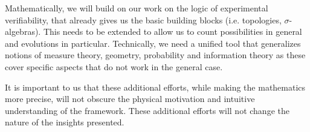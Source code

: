 \documentclass[letterpaper,twocolumn]{article}
\begin{document}
Mathematically, we will build on our work on the logic of experimental verifiability, that already gives us the basic building blocks (i.e. topologies, $\sigma$-algebras). This needs to be extended to allow us to count possibilities in general and evolutions in particular. Technically, we need a unified tool that generalizes notions of measure theory, geometry, probability and information theory as these cover specific aspects that do not work in the general case.

It is important to us that these additional efforts, while making the mathematics more precise, will not obscure the physical motivation and intuitive understanding of the framework. These additional efforts will not change the nature of the insights presented. 


\end{document}
